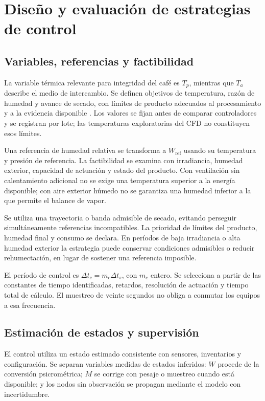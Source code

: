 \section{Diseño y evaluación de estrategias de control}
\label{met:control}

\subsection{Variables, referencias y factibilidad}

La variable térmica relevante para integridad del café es $T_p$, mientras que $T_a$ describe el medio de intercambio. Se definen objetivos de temperatura, razón de humedad y avance de secado, con límites de producto adecuados al procesamiento y a la evidencia disponible \cite{alves2017}. Los valores se fijan antes de comparar controladores y se registran por lote; las temperaturas exploratorias del CFD no constituyen esos límites.

Una referencia de humedad relativa se transforma a $W_{\mathrm{ref}}$ usando su temperatura y presión de referencia. La factibilidad se examina con irradiancia, humedad exterior, capacidad de actuación y estado del producto. Con ventilación sin calentamiento adicional no se exige una temperatura superior a la energía disponible; con aire exterior húmedo no se garantiza una humedad inferior a la que permite el balance de vapor.

Se utiliza una trayectoria o banda admisible de secado, evitando perseguir simultáneamente referencias incompatibles. La prioridad de límites del producto, humedad final y consumo se declara. En períodos de baja irradiancia o alta humedad exterior la estrategia puede conservar condiciones admisibles o reducir rehumectación, en lugar de sostener una referencia imposible.

El período de control es $\Delta t_c=m_c\Delta t_s$, con $m_c$ entero. Se selecciona a partir de las constantes de tiempo identificadas, retardos, resolución de actuación y tiempo total de cálculo. El muestreo de veinte segundos no obliga a conmutar los equipos a esa frecuencia.

\subsection{Estimación de estados y supervisión}
\label{met:estimacion}

El control utiliza un estado estimado consistente con sensores, inventarios y configuración. Se separan variables medidas de estados inferidos: $W$ procede de la conversión psicrométrica; $M$ se corrige con pesaje o muestreo cuando está disponible; y los nodos sin observación se propagan mediante el modelo con incertidumbre.

